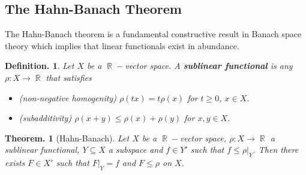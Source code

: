 \documentclass[11pt, a4paper]{memoir}
\DeclareMathOperator{\R}{{\mathbb{R}}}
\theoremstyle{change}
\newtheorem{theorem}{Theorem.}[section]
\theoremstyle{plain}
\theoremstyle{nonumberplain}
\newtheorem{definition}{Definition.}
\numberwithin{equation}{section}
\begin{document}
\subsection{The Hahn-Banach Theorem}
The Hahn-Banach theorem is a fundamental constructive result in Banach space theory which implies that linear functionals exist in abundance.
\begin{definition}
    Let $X$ be a $\R-$vector space.
    A \textbf{sublinear functional} is any $\rho:X\to\R$ that satisfies
    \begin{itemize}[nl]
        \item \textit{(non-negative homogenity)} $\rho(tx)=t\rho(x)$ for $t\geq 0$, $x\in X$.
        \item \textit{(subadditivity)} $\rho(x+y)\leq\rho(x)+\rho(y)$ for $x,y\in X$.
    \end{itemize}
\end{definition}
\begin{theorem}[Hahn-Banach]
    Let $X$ be a $\R-$vector space, $\rho:X\to\R$ a sublinear functional, $Y\subseteq X$ a subspace and $f\in Y'$ such that $f\leq\rho|_Y$.
    Then there exists $F\in X'$ such that $F|_Y=f$ and $F\leq\rho$ on $X$.
\end{theorem}
\end{document}
